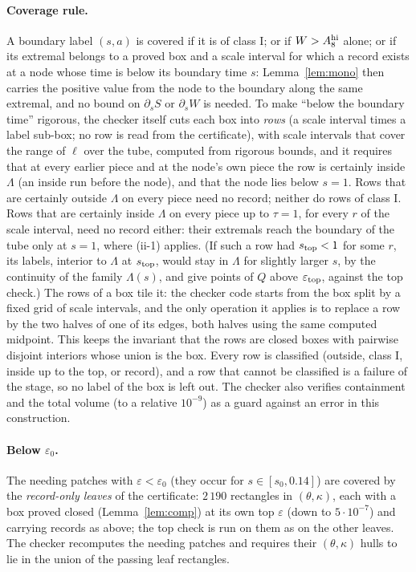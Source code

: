 \documentclass[11pt]{article}
\theoremstyle{definition}
\begin{document}
\paragraph{Coverage rule.} A boundary label $(s,a)$ is covered if it is of class I; or if $W>A_8^{\rm hi}$ alone; or
if its extremal belongs to a proved box and a scale interval for which a record exists at a node whose time is below
its boundary time $s$: Lemma~\ref{lem:mono} then carries the positive value from the node to the boundary along the
same extremal, and no bound on $\partial_sS$ or $\partial_sW$ is needed. To make ``below the boundary time'' rigorous,
the checker itself cuts each box into \emph{rows} (a scale interval times a label sub-box; no row is read from the
certificate), with scale intervals that cover the range of $\ell$ over the tube, computed from rigorous bounds, and it
requires that at every
earlier piece and at the node's own piece the row is certainly inside $\Lambda$ (an inside run before the node), and
that the node lies below $s=1$. Rows that are certainly outside $\Lambda$ on every piece need no record; neither do
rows of class I. Rows that are certainly inside $\Lambda$ on every piece up to $\tau=1$, for every $r$ of the scale
interval, need no record either: their extremals reach the boundary of the tube only at $s=1$, where (ii-1) applies.
(If such a row had $s_{\rm top}<1$ for some $r$, its labels, interior to $\Lambda$ at $s_{\rm top}$, would stay in $\Lambda$
for slightly larger $s$, by the continuity of the family $\Lambda(s)$, and give points of $Q$ above $\varepsilon_{\rm top}$,
against the top check.) The rows of a box tile it: the checker code starts from the box split by a fixed grid of
scale intervals, and the only operation it applies is to replace a row by the two halves of one of its edges, both
halves using the same computed midpoint. This keeps the invariant that the rows are closed boxes with pairwise
disjoint interiors whose union is the box. Every row is classified (outside, class I, inside up to the top, or record),
and a row that cannot be classified is a failure of the stage, so no label of the box is left out. The checker also
verifies containment and the total volume (to a relative $10^{-9}$) as a guard against an error in this construction.

\paragraph{Below $\varepsilon_0$.} The needing patches with $\varepsilon<\varepsilon_0$ (they occur for
$s\in[s_0,0.14]$) are covered by the \emph{record-only leaves} of the certificate: $2\,190$ rectangles in
$(\theta,\kappa)$, each with a box proved closed (Lemma~\ref{lem:comp}) at its own top $\varepsilon$ (down to
$5\cdot10^{-7}$) and carrying records as above; the top check is run on them as on the other leaves. The checker
recomputes the needing patches and requires their
$(\theta,\kappa)$ hulls to lie in the union of the passing leaf rectangles.
\end{document}
